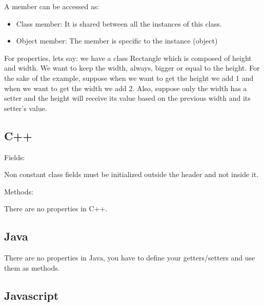 \documentclass{KodeBook}
\begin{document}
A member can be accessed as: 
\begin{itemize}
	\item Class member: It is shared between all the instances of this class.
	\item Object member: The member is specific to the instance (object)
\end{itemize}

For properties, lets say: we have a class Rectangle which is composed of height and width. 
We want to keep the width, always, bigger or equal to the height.
For the sake of the example, suppose when we want to get the height we add 1 and when we want to get the width we add 2.
Also, suppose only the width has a setter and the height will receive its value based on the previous width and its setter's value.

\subsection{C++}

Fields: 


Non constant class fields must be initialized outside the header and not inside it. 

 

Methods:





There are no properties in C++.

\subsection{Java}





There are no properties in Java, you have to define your getters/setters and use them as methods. 


\subsection{Javascript}
\end{document}
